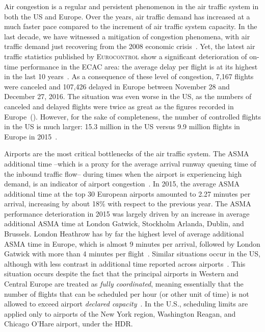 \documentclass[draft,review]{elsarticle}
\begin{document}
Air congestion is a regular and persistent phenomenon in the air traffic system in both the US and Europe.
Over the years, air traffic demand has increased at a much faster pace compared to the increment of air traffic system capacity.
In the last decade, we have witnessed a mitigation of congestion phenomena, with air traffic demand just recovering from the 2008 economic crisis~\citep[\S{}1.2]{prr2017}. Yet, the latest air traffic statistics published by \textsc{Eurocontrol} show a significant deterioration of on-time performance in the \acl{ECAC} area: the average delay per flight is at its highest in the last 10 years~\citep{coda2016}.
As a consequence of these level of congestion, 7,167 flights were canceled and 107,426  delayed in Europe between November 28 and December 27, 2016.
The situation was even worse in the US, as the numbers of canceled and delayed flights were twice as great as the figures recorded in Europe~(\citeauthor{flightstats}).
However, for the sake of completeness, the number of controlled flights in the US is much larger: 15.3 million  in the US versus 9.9 million flights in Europe in 2015~\citep{EUCTRL-FAA2015}.

Airports are the most critical bottlenecks of the air traffic system. The \ac{ASMA} additional time --which is a proxy for the average arrival runway queuing time of the inbound traffic flow-- during times when the airport is experiencing high demand, is an indicator of airport congestion~\citep{ASMA-def}. In 2015, the average \acs{ASMA} additional time at the top 30 European airports amounted to  2.27 minutes per arrival, increasing by about 18\% with respect to the previous year.
The \ac{ASMA} performance deterioration in 2015 was largely driven by an increase in average additional \ac{ASMA} time at London Gatwick, Stockholm Arlanda, Dublin, and Brussels.
London Heathrow has by far the highest level of average additional \ac{ASMA} time in Europe, which is almost 9 minutes per arrival, followed by London Gatwick with more than 4 minutes per flight~\citep{PRR2015}.
Similar situations occur in the US, although with less contrast in additional time reported across airports~\citep{EUCTRL-FAA2015}.
This situation occurs despite the fact that the principal airports in Western and Central Europe are treated as \emph{fully coordinated}, meaning essentially that the number of flights that can be scheduled per hour (or other unit of time) is not allowed to exceed airport \emph{declared capacity}~\citep{deNO2003}.
In the U.S., scheduling limits are applied only to airports of the New York region, Washington Reagan, and Chicago O'Hare airport, under the \acl{HDR}.
\end{document}
